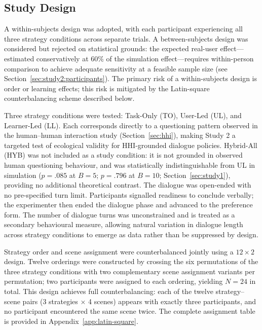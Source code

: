 \documentclass[manuscript,review,anonymous]{acmart}
\begin{document}
\subsection{Study Design}
\label{sec:study2:design}

A within-subjects design was adopted, with each participant experiencing all three strategy conditions across separate trials. A between-subjects design was considered but rejected on statistical grounds: the expected real-user effect---estimated conservatively at 60\% of the simulation effect---requires within-person comparison to achieve adequate sensitivity at a feasible sample size (see Section~\ref{sec:study2:participants}). The primary risk of a within-subjects design is order or learning effects; this risk is mitigated by the Latin-square counterbalancing scheme described below.

Three strategy conditions were tested: Task-Only (TO), User-Led (UL), and Learner-Led (LL). Each corresponds directly to a questioning pattern observed in the human--human interaction study (Section~\ref{sec:hhi}), making Study 2 a targeted test of ecological validity for HHI-grounded dialogue policies. Hybrid-All (HYB) was not included as a study condition: it is not grounded in observed human questioning behaviour, and was statistically indistinguishable from UL in simulation ($p = .085$ at $B = 5$; $p = .796$ at $B = 10$; Section~\ref{sec:study1}), providing no additional theoretical contrast. The dialogue was open-ended with no pre-specified turn limit. Participants signalled readiness to conclude verbally; the experimenter then ended the dialogue phase and advanced to the preference form. The number of dialogue turns was unconstrained and is treated as a secondary behavioural measure, allowing natural variation in dialogue length across strategy conditions to emerge as data rather than be suppressed by design.

Strategy order and scene assignment were counterbalanced jointly using a $12 \times 2$ design. Twelve orderings were constructed by crossing the six permutations of the three strategy conditions with two complementary scene assignment variants per permutation; two participants were assigned to each ordering, yielding $N = 24$ in total. This design achieves full counterbalancing: each of the twelve strategy--scene pairs (3 strategies $\times$ 4 scenes) appears with exactly three participants, and no participant encountered the same scene twice. The complete assignment table is provided in Appendix~\ref{app:latin-square}.
\end{document}
